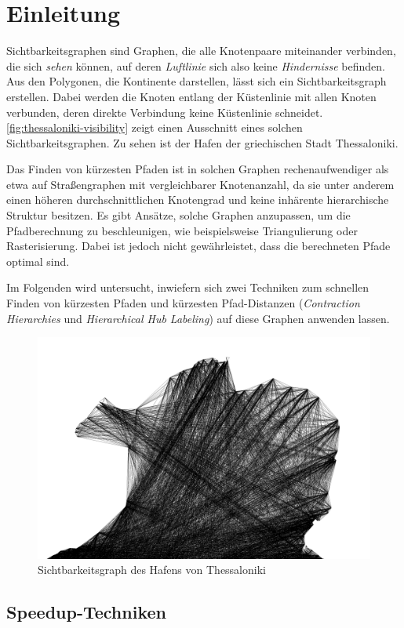 \chapter{Einleitung}

Sichtbarkeitsgraphen sind Graphen, die alle Knotenpaare miteinander verbinden, die sich \emph{sehen} können, auf deren \emph{Luftlinie} sich also keine \emph{Hindernisse} befinden.
Aus den Polygonen, die Kontinente darstellen, lässt sich ein Sichtbarkeitsgraph erstellen.
Dabei werden die Knoten entlang der Küstenlinie mit allen Knoten verbunden, deren direkte Verbindung keine Küstenlinie schneidet.
\autoref{fig:thessaloniki-visibility} zeigt einen Ausschnitt eines solchen Sichtbarkeitsgraphen.
Zu sehen ist der Hafen der griechischen Stadt Thessaloniki.

Das Finden von kürzesten Pfaden ist in solchen Graphen rechenaufwendiger als etwa auf Straßengraphen mit vergleichbarer Knotenanzahl, da sie unter anderem einen höheren durchschnittlichen Knotengrad und keine inhärente hierarchische Struktur besitzen.
Es gibt Ansätze, solche Graphen anzupassen, um die Pfadberechnung zu beschleunigen, wie beispielsweise Triangulierung oder Rasterisierung.
Dabei ist jedoch nicht gewährleistet, dass die berechneten Pfade optimal sind.

Im Folgenden wird untersucht, inwiefern sich zwei Techniken zum schnellen Finden von kürzesten Pfaden und kürzesten Pfad-Distanzen (\emph{Contraction Hierarchies} und \emph{Hierarchical Hub Labeling}) auf diese Graphen anwenden lassen.

\begin{figure}[ht]%
  \centering
  \includegraphics[width=.5\linewidth]{img/thessaloniki-visibility.png}
  \caption{Sichtbarkeitsgraph des Hafens von Thessaloniki}%
  \label{fig:thessaloniki-visibility}%
\end{figure}


\section{Speedup-Techniken}

